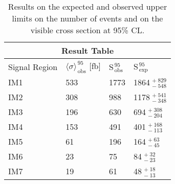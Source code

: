 \begin{table}[!h]
  \centering
  \begin{tabular}{llll}
    \toprule
    \multicolumn{4}{c}{Result Table} \\
    \midrule \midrule
    Signal Region & $\langle \sigma \rangle_\mathrm{\, obs}^{\, 95}$ [fb] & S$_\mathrm{\, obs}^{\, 95}$ & S$_\mathrm{\, exp}^{\, 95}$ \\
    \midrule
    IM1 & 533 & 1773 & 1864$_{\, -548}^{\, +829}$ \\
    IM2 & 308 & 988 & 1178$_{\, -348}^{\, +541}$ \\
    IM3 & 196 & 630 & 694$_{\, -204}^{\, +308}$ \\
    IM4 & 153 & 491 & 401$_{\, -113}^{\, +168}$ \\
    IM5 & 61 & 196 & 164$_{\, -45}^{\, +63}$ \\
    IM6 & 23 & 75 & 84$_{\, -23}^{\, +32}$ \\
    IM7 & 19 & 61 & 48$_{\, -13}^{\, +18}$ \\
    \bottomrule
  \end{tabular}
  \caption{Results on the expected and observed upper limits on the number of events and on the
    visible cross section at 95\% CL.}
  \label{tab:cs_vis_results}
\end{table}
